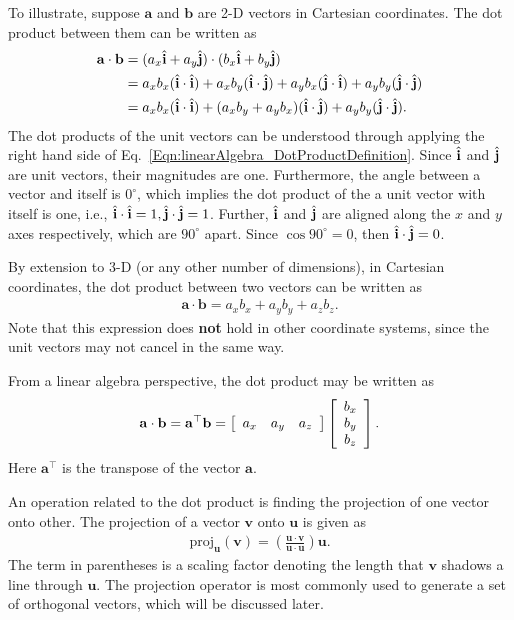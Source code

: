 To illustrate, suppose $\mathbf{a}$ and $\mathbf{b}$ are 2-D vectors in Cartesian coordinates. The dot product between them can be written as
\begin{align}
  \mathbf{a} \cdot \mathbf{b} 
  &= ( a_x \hat{\mathbf{i}} + a_y \hat{\mathbf{j}} ) \cdot ( b_x \hat{\mathbf{i}} + b_y \hat{\mathbf{j}} ) \nonumber \\
  &= a_x b_x ( \hat{\mathbf{i}} \cdot \hat{\mathbf{i}} ) + a_x b_y ( \hat{\mathbf{i}} \cdot \hat{\mathbf{j}} ) + a_y b_x ( \hat{\mathbf{j}} \cdot \hat{\mathbf{i}} ) + a_y b_y ( \hat{\mathbf{j}} \cdot \hat{\mathbf{j}} ) \nonumber \\
  &= a_x b_x ( \hat{\mathbf{i}} \cdot \hat{\mathbf{i}} ) + ( a_x b_y + a_y b_x ) ( \hat{\mathbf{i}} \cdot \hat{\mathbf{j}} ) + a_y b_y ( \hat{\mathbf{j}} \cdot \hat{\mathbf{j}} ) .
\end{align}
The dot products of the unit vectors can be understood through applying the right hand side of Eq.~\eqref{Eqn:linearAlgebra_DotProductDefinition}. Since $\hat{\mathbf{i}}$ and $\hat{\mathbf{j}}$ are unit vectors, their magnitudes are one. Furthermore, the angle between a vector and itself is $0^\circ$, which implies the dot product of the a unit vector with itself is one, i.e., $\hat{\mathbf{i}} \cdot \hat{\mathbf{i}} = 1, \hat{\mathbf{j}} \cdot \hat{\mathbf{j}} = 1$. Further, $\hat{\mathbf{i}}$ and $\hat{\mathbf{j}}$ are aligned along the $x$ and $y$ axes respectively, which are $90^\circ$ apart. Since $\cos 90^\circ = 0$, then $\hat{\mathbf{i}} \cdot \hat{\mathbf{j}} = 0$. 

By extension to 3-D (or any other number of dimensions), in Cartesian coordinates, the dot product between two vectors can be written as
\begin{align}
  \mathbf{a} \cdot \mathbf{b} = a_x b_x + a_y b_y + a_z b_z.
\end{align}
Note that this expression does {\bf not} hold in other coordinate systems, since the unit vectors may not cancel in the same way.

From a linear algebra perspective, the dot product may be written as
\begin{align}
  \mathbf{a} \cdot \mathbf{b} = \mathbf{a}^\top \mathbf{b} = 
  \left[ \begin{array}{c c c} a_x & a_y & a_z \end{array} \right] \left[ \begin{array}{c} b_x \\ b_y \\ b_z \end{array} \right] .
\end{align}
Here $\mathbf{a}^\top$ is the transpose of the vector $\mathbf{a}$.

An operation related to the dot product is finding the projection of one vector onto other. The projection of a vector $\mathbf{v}$ onto $\mathbf{u}$ is given as
\begin{align} \label{Eqn:linearAlgebra_VectorProjection}
  \text{proj}_\mathbf{u}(\mathbf{v}) = \left( \frac{ \mathbf{u} \cdot \mathbf{v} }{ \mathbf{u} \cdot \mathbf{u} } \right) \mathbf{u} .
\end{align}
The term in parentheses is a scaling factor denoting the length that $\mathbf{v}$ shadows a line through $\mathbf{u}$. The projection operator is most commonly used to generate a set of orthogonal vectors, which will be discussed later.

